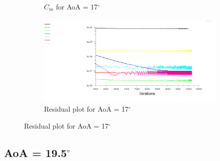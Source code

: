 \begin{figure}[H]
\begin{subfigure}[b]{0.5\textwidth}
    \caption{$C_m$ for AoA = 17$^\circ$}
    \label{fig:aoa_17_cm}
  \end{subfigure}
  \begin{subfigure}[b]{0.5\textwidth}
    \includegraphics[width=\textwidth]{17_deg/AoA_17_resid.png}
    \caption{Residual plot for AoA = 17$^\circ$}
    \label{fig:aoa_17_resid}
  \end{subfigure}
\end{figure}

\subsection*{AoA = 19.5$^\circ$}

